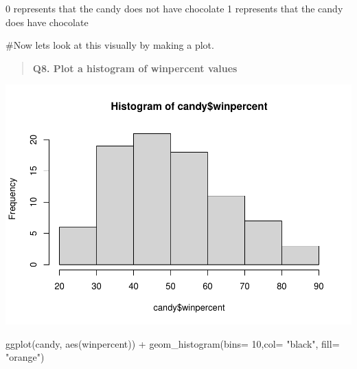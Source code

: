 \documentclass[
]{article}
\newenvironment{Shaded}{\begin{snugshade}}{\end{snugshade}}
\newcommand{\AttributeTok}[1]{\textcolor[rgb]{0.77,0.63,0.00}{#1}}
\newcommand{\CommentTok}[1]{\textcolor[rgb]{0.56,0.35,0.01}{\textit{#1}}}
\newcommand{\DecValTok}[1]{\textcolor[rgb]{0.00,0.00,0.81}{#1}}
\newcommand{\FunctionTok}[1]{\textcolor[rgb]{0.00,0.00,0.00}{#1}}
\newcommand{\NormalTok}[1]{#1}
\newcommand{\SpecialCharTok}[1]{\textcolor[rgb]{0.00,0.00,0.00}{#1}}
\newcommand{\StringTok}[1]{\textcolor[rgb]{0.31,0.60,0.02}{#1}}
\begin{document}
0 represents that the candy does not have chocolate 1 represents that
the candy does have chocolate

\#Now lets look at this visually by making a plot.

\begin{quote}
\textbf{Q8. Plot a histogram of winpercent values}
\end{quote}

\begin{Shaded}
\end{Shaded}

\includegraphics{Class-10-Halloween-Candy_files/figure-latex/unnamed-chunk-8-1.pdf}

\begin{Shaded}
\begin{Highlighting}[]
\FunctionTok{ggplot}\NormalTok{(candy, }\FunctionTok{aes}\NormalTok{(winpercent)) }\SpecialCharTok{+} \FunctionTok{geom\_histogram}\NormalTok{(}\AttributeTok{bins=} \DecValTok{10}\NormalTok{,}\AttributeTok{col=} \StringTok{"black"}\NormalTok{, }\AttributeTok{fill=} \StringTok{"orange"}\NormalTok{)}
\end{Highlighting}
\end{Shaded}
\end{document}
